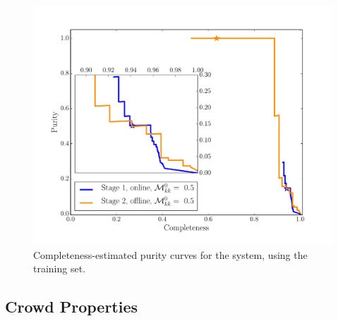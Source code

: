 \documentclass[useAMS,usenatbib,a4paper]{mn2e}
\begin{document}
\begin{figure}
\centering\includegraphics[width=\linewidth]{completeness_purity_simple.pdf}
\caption{Completeness-estimated purity curves for the \sw system, using
the \cfhtls training set.}
\label{fig:results:sample:CP}
\end{figure}


\subsection{Crowd Properties}
\label{sec:results:crowd}
\end{document}
